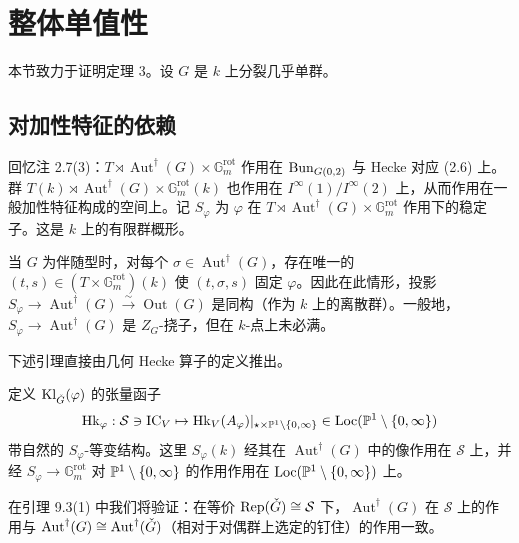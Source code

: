 
\section{整体单值性}

本节致力于证明定理 3。设 $G$ 是 $k$ 上分裂几乎单群。

\subsection{对加性特征的依赖}

回忆注 2.7(3)：$T\rtimes\operatorname{Aut}^\dagger(G)\times\mathbb{G}_m^{\mathrm{rot}}$ 作用在 $\mathrm{Bun}_{G(0,2)}$ 与 Hecke 对应 (2.6) 上。群 $T(k)\rtimes\operatorname{Aut}^\dagger(G)\times\mathbb{G}_m^{\mathrm{rot}}(k)$ 也作用在 $I^\infty(1)/I^\infty(2)$ 上，从而作用在一般加性特征构成的空间上。记 $S_\varphi$ 为 $\varphi$ 在 $T\rtimes\operatorname{Aut}^\dagger(G)\times\mathbb{G}_m^{\mathrm{rot}}$ 作用下的稳定子。这是 $k$ 上的有限群概形。

当 $G$ 为伴随型时，对每个 $\sigma\in\operatorname{Aut}^\dagger(G)$，存在唯一的 $(t,s)\in(T\times\mathbb{G}_m^{\mathrm{rot}})(k)$ 使 $(t,\sigma,s)$ 固定 $\varphi$。因此在此情形，投影 $S_\varphi\to\operatorname{Aut}^\dagger(G)\xrightarrow{\sim}\operatorname{Out}(G)$ 是同构（作为 $k$ 上的离散群）。一般地，$S_\varphi\to\operatorname{Aut}^\dagger(G)$ 是 $Z_G$-挠子，但在 $k$-点上未必满。

下述引理直接由几何 Hecke 算子的定义推出。

\begin{lemma}
定义 $\mathrm{Kl}_{\check G}(\varphi)$ 的张量函子
\[
\mathrm{Hk}_\varphi:\mathcal S\ni\mathrm{IC}_V\mapsto\mathrm{Hk}_V(A_\varphi)|_{\star\times\mathbb{P}^1\setminus\{0,\infty\}}\in\mathrm{Loc}(\mathbb{P}^1\setminus\{0,\infty\})
\]
带自然的 $S_\varphi$-等变结构。这里 $S_\varphi(k)$ 经其在 $\operatorname{Aut}^\dagger(G)$ 中的像作用在 $\mathcal S$ 上，并经 $S_\varphi\to\mathbb{G}_m^{\mathrm{rot}}$ 对 $\mathbb{P}^1\setminus\{0,\infty\}$ 的作用作用在 $\mathrm{Loc}(\mathbb{P}^1\setminus\{0,\infty\})$ 上。
\end{lemma}

在引理 9.3(1) 中我们将验证：在等价 $\mathrm{Rep}(\check G)\cong\mathcal S$ 下，$\operatorname{Aut}^\dagger(G)$ 在 $\mathcal S$ 上的作用与 $\operatorname{Aut}^\dagger(G)\cong\operatorname{Aut}^\dagger(\check G)$（相对于对偶群上选定的钉住）的作用一致。

